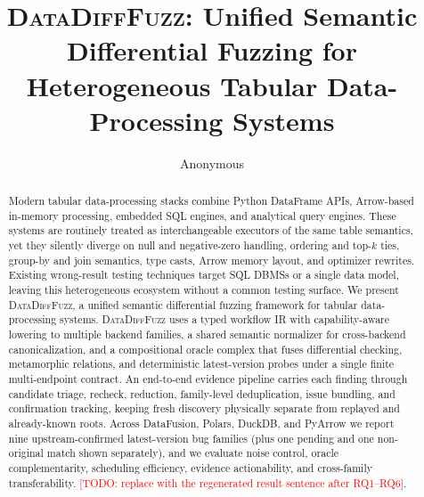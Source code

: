 \documentclass[sigconf,review,anonymous]{acmart}
\newcommand{\todo}[1]{\textcolor{red}{[TODO: #1]}}
\newcommand{\sys}{\textsc{DataDiffFuzz}\xspace}
\begin{document}
\title{\sys{}: Unified Semantic Differential Fuzzing for Heterogeneous
Tabular Data-Processing Systems}

\author{Anonymous}

\begin{abstract}
Modern tabular data-processing stacks combine Python DataFrame APIs, Arrow-based in-memory
processing, embedded SQL engines, and analytical query engines. These systems are routinely
treated as interchangeable executors of the same table semantics, yet they silently diverge on
null and negative-zero handling, ordering and top-$k$ ties, group-by and join semantics, type
casts, Arrow memory layout, and optimizer rewrites. Existing wrong-result testing techniques
target SQL DBMSs or a single data model, leaving this heterogeneous ecosystem without a common
testing surface. We present \sys{}, a unified semantic differential fuzzing framework for
tabular data-processing systems. \sys{} uses a typed workflow IR with capability-aware lowering
to multiple backend families, a shared semantic normalizer for cross-backend canonicalization,
and a compositional oracle complex that fuses differential checking, metamorphic relations, and
deterministic latest-version probes under a single finite multi-endpoint contract. An end-to-end
evidence pipeline carries each finding through candidate triage, recheck, reduction,
family-level deduplication, issue bundling, and confirmation tracking, keeping fresh discovery
physically separate from replayed and already-known roots. Across DataFusion, Polars, DuckDB,
and PyArrow we report nine upstream-confirmed latest-version bug families (plus one pending and
one non-original match shown separately), and we evaluate noise control, oracle complementarity,
scheduling efficiency, evidence actionability, and cross-family transferability. \todo{replace
with the regenerated result sentence after RQ1--RQ6}.
\end{abstract}


\maketitle













\appendix

\end{document}
